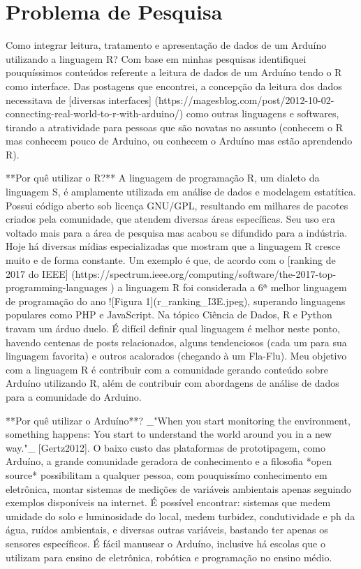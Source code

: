 \chapter*[Problema de Pesquisa]{Problema de Pesquisa}

Como integrar leitura, tratamento e apresentação de dados de um Arduíno 
utilizando a linguagem R? Com base em minhas pesquisas identifiquei 
pouquíssimos conteúdos referente a leitura de dados de um Arduíno tendo o R como 
interface. Das postagens que encontrei, a concepção da leitura dos dados 
necessitava de [diversas 
interfaces]
(https://magesblog.com/post/2012-10-02-connecting-real-world-to-r-with-arduino/) 
como outras linguagens e softwares, tirando a atratividade para pessoas que são 
novatas no assunto (conhecem o R mas conhecem pouco de Arduino, ou conhecem o 
Arduíno mas estão aprendendo R).

**Por quê utilizar o R?** A linguagem de programação R, um dialeto da linguagem 
S, é amplamente utilizada em análise de dados e modelagem estatítica. Possui 
código aberto sob licença GNU/GPL, resultando em milhares de pacotes criados 
pela comunidade, que atendem diversas áreas específicas. Seu uso era voltado 
mais para a área de pesquisa mas acabou se difundido para a indústria. Hoje há 
diversas mídias especializadas que mostram que a linguagem R cresce muito e de 
forma constante. Um exemplo é que, de acordo com o [ranking de 2017 do 
IEEE]
(https://spectrum.ieee.org/computing/software/the-2017-top-programming-languages
) a linguagem R foi considerada a 6ª melhor linguagem de programação do ano 
![Figura 1](r_ranking_I3E.jpeg), superando linguagens populares como PHP e 
JavaScript.
Na tópico Ciência de Dados, R e Python travam um árduo duelo. É difícil definir 
qual linguagem é melhor neste ponto, havendo centenas de posts relacionados, 
alguns tendenciosos (cada um para sua linguagem favorita) e outros acalorados 
(chegando à um Fla-Flu). Meu objetivo com a linguagem R é contribuir com a 
comunidade gerando conteúdo sobre Arduíno utilizando R, além de contribuir com 
abordagens de análise de dados para a comunidade do Arduino.

**Por quê utilizar o Arduíno**? _"When you start monitoring the environment, 
something happens: You start to understand the world around you in a new way."_ 
[Gertz2012]. O baixo custo das plataformas de prototipagem, como Arduíno, a 
grande comunidade geradora de conhecimento e a filosofia *open source* 
possibilitam a qualquer pessoa, com pouquissímo conhecimento em eletrônica, 
montar sistemas de medições de variáveis ambientais apenas seguindo exemplos 
disponíveis na internet. É possível encontrar: sistemas que medem umidade do 
solo e luminosidade do local, medem turbidez, condutividade e ph da água, ruídos 
ambientais, e diversas outras variáveis, bastando ter apenas os sensores 
específicos. É fácil manusear o Arduíno, inclusive há escolas que o utilizam 
para ensino de eletrônica, robótica e programação no ensino médio.
 
